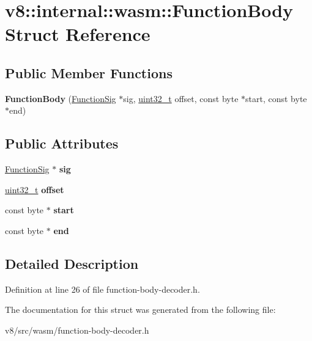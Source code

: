 \hypertarget{structv8_1_1internal_1_1wasm_1_1FunctionBody}{}\section{v8\+:\+:internal\+:\+:wasm\+:\+:Function\+Body Struct Reference}
\label{structv8_1_1internal_1_1wasm_1_1FunctionBody}
\subsection*{Public Member Functions}
\begin{DoxyCompactItemize}
\item 
\mbox{\label{structv8_1_1internal_1_1wasm_1_1FunctionBody_a9a3d6f8509fffcdbc6c37881f2831c6c}} 
{\bfseries Function\+Body} (\mbox{\hyperlink{classv8_1_1internal_1_1Signature}{Function\+Sig}} $\ast$sig, \mbox{\hyperlink{classuint32__t}{uint32\+\_\+t}} offset, const byte $\ast$start, const byte $\ast$end)
\end{DoxyCompactItemize}
\subsection*{Public Attributes}
\begin{DoxyCompactItemize}
\item 
\mbox{\label{structv8_1_1internal_1_1wasm_1_1FunctionBody_a215eb576b0c198d6d5e38b35abae2f69}} 
\mbox{\hyperlink{classv8_1_1internal_1_1Signature}{Function\+Sig}} $\ast$ {\bfseries sig}
\item 
\mbox{\label{structv8_1_1internal_1_1wasm_1_1FunctionBody_af4697623a030370575aa18d13e307676}} 
\mbox{\hyperlink{classuint32__t}{uint32\+\_\+t}} {\bfseries offset}
\item 
\mbox{\label{structv8_1_1internal_1_1wasm_1_1FunctionBody_aed2f017a2c7e4ddd126aa8d09708564f}} 
const byte $\ast$ {\bfseries start}
\item 
\mbox{\label{structv8_1_1internal_1_1wasm_1_1FunctionBody_a3beb810e639bc9ea8d3be60ff4ea6348}} 
const byte $\ast$ {\bfseries end}
\end{DoxyCompactItemize}


\subsection{Detailed Description}


Definition at line 26 of file function-\/body-\/decoder.\+h.



The documentation for this struct was generated from the following file\+:\begin{DoxyCompactItemize}
\item 
v8/src/wasm/function-\/body-\/decoder.\+h\end{DoxyCompactItemize}
